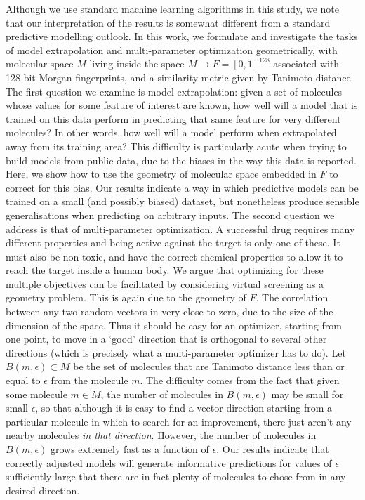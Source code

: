 \documentclass{article}
\begin{document}
Although we use standard machine learning algorithms in this study, we note that our interpretation of the results is somewhat different from a standard predictive modelling outlook. 
In this work, we formulate and investigate  the tasks of model extrapolation and multi-parameter optimization geometrically, with molecular space $M$ living inside the space $M \to F = [0, 1]^{128}$ associated with 128-bit Morgan fingerprints, and a similarity metric given by Tanimoto distance. 
\newline
\newline
The first question we examine is model extrapolation: given a set of molecules whose values for some feature of interest are known, how well will a model that is trained on this data perform in predicting that same feature for very different molecules? In other words, how well will a model perform when extrapolated away from its training area? This difficulty is particularly acute when trying to build models from public data, due to the biases in the way this data is reported\cite{Kalliokoski2013,Tiikkainen2013}. Here, we show how to use the geometry of molecular space embedded in $F$ to correct for this bias. Our results indicate a way in which predictive models can be trained on a small (and possibly biased) dataset, but nonetheless produce sensible generalisations when predicting on arbitrary inputs.
\newline
\newline
The second question we address is that of multi-parameter optimization.  A successful drug requires many different properties and being active against the target is only one of these.  It must also be non-toxic, and have the correct chemical properties to allow it to reach the target inside a human body.  We argue that optimizing for these multiple objectives can be facilitated by considering virtual screening as a geometry problem.
This is again due to the geometry of $F$. The correlation between any two random vectors in very close to zero, due to the size of the dimension of the space.  Thus it should be easy for an optimizer, starting from one point, to move in a `good' direction that is orthogonal to several other directions (which is precisely what a multi-parameter optimizer has to do).  Let $B(m, \epsilon) \subset M$ be the set of molecules that are Tanimoto distance less than or equal to $\epsilon$ from the molecule $m$.  The difficulty comes from the fact that given some molecule $m \in M$, the number of molecules in  $B(m, \epsilon)$ may be small for small $\epsilon$, so that although it is easy to find a vector direction starting from a particular molecule in which to search for an improvement, there just aren't any nearby molecules \textit{in that direction}. However, the number of molecules in $B(m, \epsilon)$ grows extremely fast as a function of $\epsilon$.  Our results indicate that correctly adjusted models will generate informative predictions for values of $\epsilon$ sufficiently large that there are in fact plenty of molecules to chose from in any desired direction.
\end{document}
